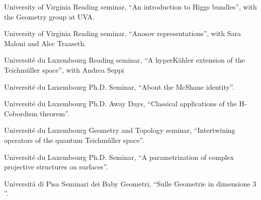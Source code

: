 {University of Virginia}
{Reading seminar,}
{``An introduction to Higgs bundles'', with the Geometry group at UVA.}

\vspace{0.5em}

{University of Virginia}
{Reading seminar,}
{``Anosov representations'', with Sara Maloni and Alec Traaseth.}

\vspace{0.5em}

{Universit{\'e} du Luxembourg}
{Reading seminar,}
{``A hyperK{\"a}hler extension of the Teichm{\"u}ller space'', with Andrea Seppi}

\vspace{0.5em}

{Universit{\'e} du Luxembourg}
{Ph.D. Seminar,}
{``About the McShane identity''.}

\vspace{0.5em}

{Universit{\'e} du Luxembourg}
{Ph.D. Away Days,}
{``Classical applications of the H-Cobordism theorem''.}

\vspace{0.5em}

{Universit{\'e} du Luxembourg}
{Geometry and Topology seminar,}
{``Intertwining operators of the quantum Teichm\"uller space''.}

\vspace{0.5em}

{Universit{\'e} du Luxembourg}
{Ph.D. Seminar,}
{``A parametrization of complex projective structures on surfaces''.}

\vspace{0.5em}

{Universit{\'a} di Pisa}
{Seminari dei Baby Geometri,}
{``Sulle Geometrie in dimensione $3$''.}
